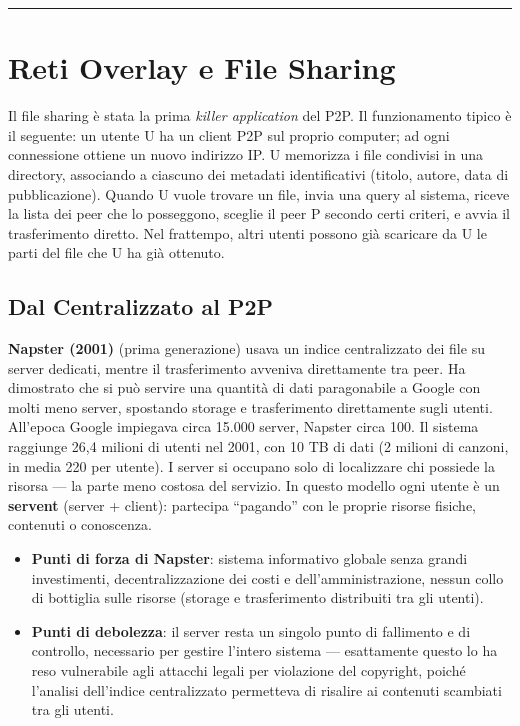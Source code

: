 \documentclass[
  italian,
  openany]{book}
\providecommand{\tightlist}{%
  \setlength{\itemsep}{0pt}\setlength{\parskip}{0pt}}
\begin{document}
\begin{center}\rule{0.5\linewidth}{0.5pt}\end{center}

\section{Reti Overlay e File Sharing}\label{reti-overlay-e-file-sharing}

Il file sharing è stata la prima \emph{killer application} del P2P. Il
funzionamento tipico è il seguente: un utente U ha un client P2P sul
proprio computer; ad ogni connessione ottiene un nuovo indirizzo IP. U
memorizza i file condivisi in una directory, associando a ciascuno dei
metadati identificativi (titolo, autore, data di pubblicazione). Quando
U vuole trovare un file, invia una query al sistema, riceve la lista dei
peer che lo posseggono, sceglie il peer P secondo certi criteri, e avvia
il trasferimento diretto. Nel frattempo, altri utenti possono già
scaricare da U le parti del file che U ha già ottenuto.

\subsection{Dal Centralizzato al P2P}\label{dal-centralizzato-al-p2p}

\textbf{Napster (2001)} (prima generazione) usava un indice
centralizzato dei file su server dedicati, mentre il trasferimento
avveniva direttamente tra peer. Ha dimostrato che si può servire una
quantità di dati paragonabile a Google con molti meno server, spostando
storage e trasferimento direttamente sugli utenti. All'epoca Google
impiegava circa 15.000 server, Napster circa 100. Il sistema raggiunge
26,4 milioni di utenti nel 2001, con 10 TB di dati (2 milioni di
canzoni, in media 220 per utente). I server si occupano solo di
localizzare chi possiede la risorsa --- la parte meno costosa del
servizio. In questo modello ogni utente è un \textbf{servent} (server +
client): partecipa ``pagando'' con le proprie risorse fisiche, contenuti
o conoscenza.

\begin{itemize}
\tightlist
\item
  \textbf{Punti di forza di Napster}: sistema informativo globale senza
  grandi investimenti, decentralizzazione dei costi e
  dell'amministrazione, nessun collo di bottiglia sulle risorse (storage
  e trasferimento distribuiti tra gli utenti).
\item
  \textbf{Punti di debolezza}: il server resta un singolo punto di
  fallimento e di controllo, necessario per gestire l'intero sistema ---
  esattamente questo lo ha reso vulnerabile agli attacchi legali per
  violazione del copyright, poiché l'analisi dell'indice centralizzato
  permetteva di risalire ai contenuti scambiati tra gli utenti.
\end{itemize}
\end{document}
